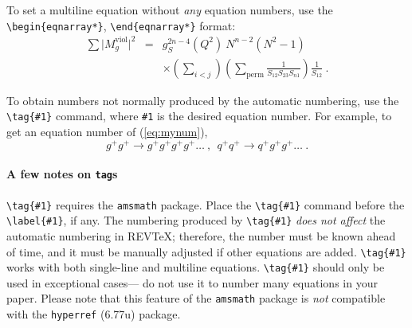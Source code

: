 \documentclass[%
 reprint,
 amsmath,amssymb,
 aps,
]{revtex4-2}
\begin{document}
To set a multiline equation without \emph{any} equation
numbers, use the \verb+\begin{eqnarray*}+,
\verb+\end{eqnarray*}+ format:
\begin{eqnarray*}
\sum \vert M^{\text{viol}}_g \vert ^2&=&g^{2n-4}_S(Q^2)~N^{n-2}
        (N^2-1)\\
 & &\times \left( \sum_{i<j}\right)
 \left(
  \sum_{\text{perm}}\frac{1}{S_{12}S_{23}S_{n1}}
 \right)
 \frac{1}{S_{12}}~.
\end{eqnarray*}

To obtain numbers not normally produced by the automatic numbering,
use the \verb+\tag{#1}+ command, where \verb+#1+ is the desired
equation number. For example, to get an equation number of
(\ref{eq:mynum}),
\begin{equation}
g^+g^+ \rightarrow g^+g^+g^+g^+ \dots ~,~~q^+q^+\rightarrow
q^+g^+g^+ \dots ~. \tag{2.6$'$}\label{eq:mynum}
\end{equation}

\paragraph{A few notes on \texttt{tag}s} 
\verb+\tag{#1}+ requires the \texttt{amsmath} package. 
Place the \verb+\tag{#1}+ command before the \verb+\label{#1}+, if any. 
The numbering produced by \verb+\tag{#1}+ \textit{does not affect} 
the automatic numbering in REV\TeX; 
therefore, the number must be known ahead of time, 
and it must be manually adjusted if other equations are added. 
\verb+\tag{#1}+ works with both single-line and multiline equations. 
\verb+\tag{#1}+ should only be used in exceptional cases---%
do not use it to number many equations in your paper. 
Please note that this feature of the \texttt{amsmath} package
is \emph{not} compatible with the \texttt{hyperref} (6.77u) package.
\end{document}
